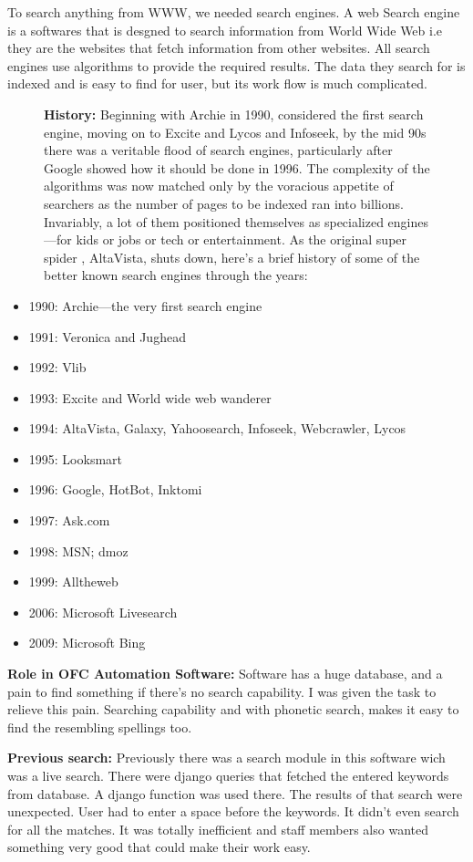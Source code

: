 To search anything from WWW, we
needed search engines. A web Search engine is a softwares  that is desgned 
to search information from World Wide Web i.e they are the websites that 
fetch information from other websites. All search engines use algorithms to 
provide the required results. The data they search for is indexed and is 
easy to find for user, but its work flow is much complicated.
\begin{figure}[h]
{\bf History:} 
Beginning with Archie in 1990, considered the first search engine, moving
on to Excite and Lycos and Infoseek, by the mid 90s there was a veritable 
flood of search engines, particularly after Google showed how it should be 
done in 1996. The complexity of the algorithms was now matched only by the
 voracious appetite of searchers as the number of pages to be indexed ran 
into billions. Invariably, a lot of them positioned themselves as specialized
engines—for kids or jobs or tech or entertainment. As the original super spider
, AltaVista, shuts down, here’s a brief history of some of the better known
search engines through the years:
\end{figure}
\begin{itemize}
\item 1990: Archie—the very first search engine
\item 1991: Veronica and Jughead
\item 1992: Vlib
\item 1993: Excite and World wide web wanderer
\item 1994: AltaVista, Galaxy, Yahoosearch, Infoseek, Webcrawler, Lycos
\item 1995: Looksmart
\item 1996: Google, HotBot, Inktomi
\item 1997: Ask.com
\item 1998: MSN; dmoz
\item 1999: Alltheweb
\item 2006: Microsoft Livesearch
\item 2009: Microsoft Bing
\end{itemize}


{\bf Role in OFC Automation Software:}
Software has a huge database, and a pain to find something if there's no search 
capability. I was given the task to relieve this pain. Searching capability and with
phonetic search, makes it easy to find the resembling spellings too.

{\bf Previous search:}
Previously there was a search module in this software 
wich was a live search. There were django queries that fetched the entered
keywords from database. A django function was used there. The results of that search were 
unexpected. User had to enter a space before the keywords. It didn't even search for all 
the matches. It was totally inefficient and staff members also wanted something very good that
could make their work easy.

